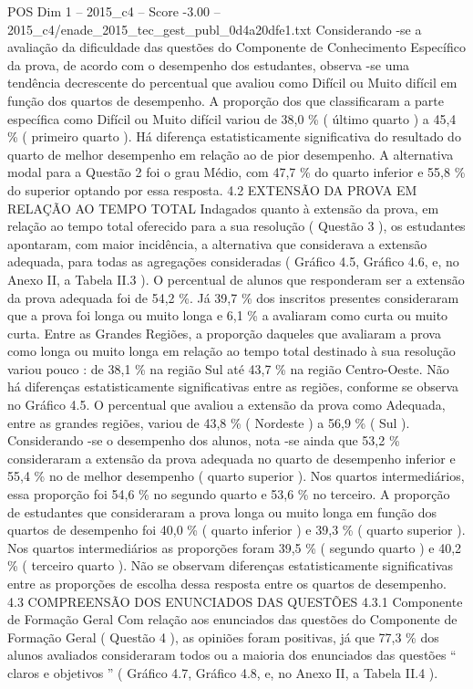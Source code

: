\begin{textsample}{POS Dim 1 – 2015\_c4 – Score -3.00 – 2015\_c4/enade\_2015\_tec\_gest\_publ\_0d4a20dfe1.txt}
Considerando -se a avaliação da dificuldade das questões do Componente de Conhecimento Específico da prova, de acordo com o desempenho dos estudantes, observa -se uma tendência decrescente do percentual que avaliou como Difícil ou Muito difícil em função dos quartos de desempenho.
A proporção dos que classificaram a parte específica como Difícil ou Muito difícil variou de 38,0 \% ( último quarto ) a 45,4 \% ( primeiro quarto ).
Há diferença estatisticamente significativa do resultado do quarto de melhor desempenho em relação ao de pior desempenho.
A alternativa modal para a Questão 2 foi o grau Médio, com 47,7 \% do quarto inferior e 55,8 \% do superior optando por essa resposta. 4.2 EXTENSÃO DA PROVA EM RELAÇÃO AO TEMPO TOTAL Indagados quanto à extensão da prova, em relação ao tempo total oferecido para a sua resolução ( Questão 3 ), os estudantes apontaram, com maior incidência, a alternativa que considerava a extensão adequada, para todas as agregações consideradas ( Gráfico 4.5, Gráfico 4.6, e, no Anexo II, a Tabela II.3 ).
O percentual de alunos que responderam ser a extensão da prova adequada foi de 54,2 \%.
Já 39,7 \% dos inscritos presentes consideraram que a prova foi longa ou muito longa e 6,1 \% a avaliaram como curta ou muito curta.
Entre as Grandes Regiões, a proporção daqueles que avaliaram a prova como longa ou muito longa em relação ao tempo total destinado à sua resolução variou pouco : de 38,1 \% na região Sul até 43,7 \% na região Centro-Oeste.
Não há diferenças estatisticamente significativas entre as regiões, conforme se observa no Gráfico 4.5.
O percentual que avaliou a extensão da prova como Adequada, entre as grandes regiões, variou de 43,8 \% ( Nordeste ) a 56,9 \% ( Sul ).
Considerando -se o desempenho dos alunos, nota -se ainda que 53,2 \% consideraram a extensão da prova adequada no quarto de desempenho inferior e 55,4 \% no de melhor desempenho ( quarto superior ).
Nos quartos intermediários, essa proporção foi 54,6 \% no segundo quarto e 53,6 \% no terceiro.
A proporção de estudantes que consideraram a prova longa ou muito longa em função dos quartos de desempenho foi 40,0 \% ( quarto inferior ) e 39,3 \% ( quarto superior ).
Nos quartos intermediários as proporções foram 39,5 \% ( segundo quarto ) e 40,2 \% ( terceiro quarto ).
Não se observam diferenças estatisticamente significativas entre as proporções de escolha dessa resposta entre os quartos de desempenho. 4.3 COMPREENSÃO DOS ENUNCIADOS DAS QUESTÕES 4.3.1 Componente de Formação Geral Com relação aos enunciados das questões do Componente de Formação Geral ( Questão 4 ), as opiniões foram positivas, já que 77,3 \% dos alunos avaliados consideraram todos ou a maioria dos enunciados das questões “ claros e objetivos ” ( Gráfico 4.7, Gráfico 4.8, e, no Anexo II, a Tabela II.4 ).

\end{textsample}
